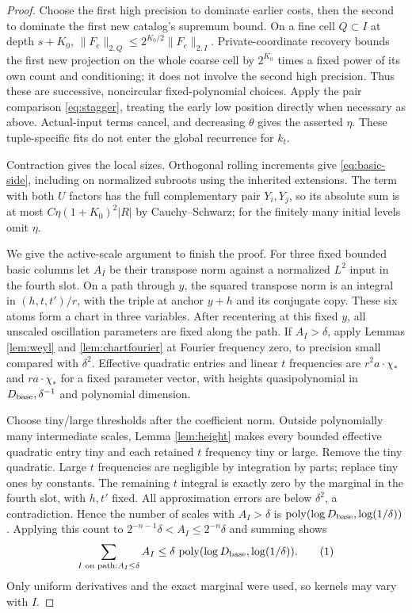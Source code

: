 \documentclass[11pt]{article}
\theoremstyle{definition}
\newcommand{\poly}{\operatorname{poly}}
\newcommand{\eqtag}[1]{\refstepcounter{equation}\tag{\theequation}\label{#1}}
\numberwithin{equation}{section}
\begin{document}
\begin{proof}
Choose the first high precision to dominate earlier costs, then the second to dominate the first new catalog's supremum bound. On a fine cell $Q\subset I$ at depth $s+K_0$, $\|F_e\|_{2,Q}\le2^{K_0/2}\|F_e\|_{2,I}$. Private-coordinate recovery bounds the first new projection on the whole coarse cell by $2^{K_0}$ times a fixed power of its own count and conditioning; it does not involve the second high precision. Thus these are successive, noncircular fixed-polynomial choices. Apply the pair comparison \eqref{eq:stagger}, treating the early low position directly when necessary as above. Actual-input terms cancel, and decreasing $\theta$ gives the asserted $\eta$. These tuple-specific fits do not enter the global recurrence for $k_t$.

Contraction gives the local sizes. Orthogonal rolling increments give \eqref{eq:basic-side}, including on normalized subroots using the inherited extensions. The term with both $U$ factors has the full complementary pair $Y_i,Y_j$, so its absolute sum is at most $C\eta(1+K_0)^2|R|$ by Cauchy--Schwarz; for the finitely many initial levels omit $\eta$.

We give the active-scale argument to finish the proof. For three fixed bounded basic columns let $A_I$ be their transpose norm against a normalized $L^2$ input in the fourth slot. On a path through $y$, the squared transpose norm is an integral in $(h,t,t')/r$, with the triple at anchor $y+h$ and its conjugate copy. These six atoms form a chart in three variables. After recentering at this fixed $y$, all unscaled oscillation parameters are fixed along the path. If $A_I>\delta$, apply Lemmas \ref{lem:weyl} and \ref{lem:chartfourier} at Fourier frequency zero, to precision small compared with $\delta^2$. Effective quadratic entries and linear $t$ frequencies are $r^2a\cdot\chi_*$ and $ra\cdot\chi_*$ for a fixed parameter vector, with heights quasipolynomial in $D_{\rm base},\delta^{-1}$ and polynomial dimension.

Choose tiny/large thresholds after the coefficient norm. Outside polynomially many intermediate scales, Lemma \ref{lem:height} makes every bounded effective quadratic entry tiny and each retained $t$ frequency tiny or large. Remove the tiny quadratic. Large $t$ frequencies are negligible by integration by parts; replace tiny ones by constants. The remaining $t$ integral is exactly zero by the marginal in the fourth slot, with $h,t'$ fixed. All approximation errors are below $\delta^2$, a contradiction. Hence the number of scales with $A_I>\delta$ is $\poly(\log D_{\rm base},\log(1/\delta))$. Applying this count to $2^{-n-1}\delta<A_I\le2^{-n}\delta$ and summing shows
\[
 \sum_{I\text{ on path}:A_I\le\delta}A_I
 \le\delta\,\poly(\log D_{\rm base},\log(1/\delta)).
 \eqtag{eq:triple-tail}
\]
Only uniform derivatives and the exact marginal were used, so kernels may vary with $I$.


\end{proof}
\end{document}
